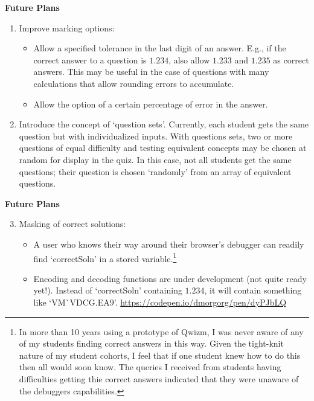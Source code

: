 \documentclass[11pt,xcolor={svgnames, x11names}]{beamer}
\begin{document}
\begin{frame}{\bf Future Plans}

	\begin{enumerate}
		
		\item<1-|alert@1> Improve marking options:
		\begin{itemize}
			\item Allow a specified tolerance in the last digit of an answer. \lb E.g., if the correct answer to a question is $1.234$, also allow $1.233$ and $1.235$ as correct answers. This may be useful in the case of questions with many calculations that allow rounding errors to accumulate. \pars
			\item Allow the option of a certain percentage of error in the answer.
		\end{itemize}\parm
		\item<2-|alert@2> Introduce the concept of `question sets'. Currently, each student gets the same question but with individualized inputs. With questions sets, two or more questions of equal difficulty and testing equivalent concepts may be chosen at random for display in the quiz. In this case, not all students get the same questions; their question is chosen `randomly' from an array of equivalent questions.
	\end{enumerate}

\end{frame}	

\begin{frame}{\bf Future Plans}

	\begin{enumerate}
		\setcounter{enumi}{2}
		\item<1-|alert@1> Masking of correct solutions:
		\begin{itemize}
			\item A user who knows their way around their browser's debugger can readily find `correctSoln' in a stored variable.\footnote[frame,1]{In more than 10 years using a prototype of Qwizm, I was never aware of any of my students finding correct answers in this way. Given the tight-knit nature of my student cohorts, I feel that if one student knew how to do this then all would soon know. The queries I received from students having difficulties getting thie correct answers indicated that they were unaware of the debuggers capabilities.} \pars
			\item Encoding and decoding functions are under development (not quite ready yet!). 
			Instead of `correctSoln' containing $1.234$, it will contain something like `VM\`{}VDCG.EA9'. \scriptsize\url{https://codepen.io/dmorgorg/pen/dyPJbLQ}
		\end{itemize}
	\end{enumerate}

\end{frame}	
\end{document}

